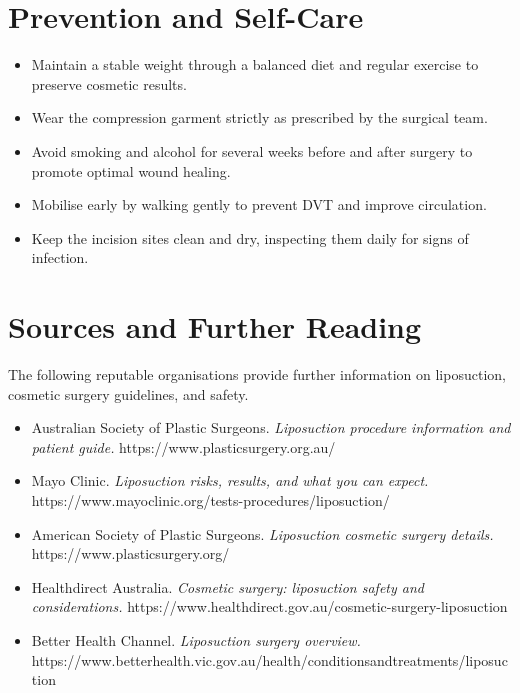 \section*{Prevention and Self-Care}
\begin{itemize}
    \item Maintain a stable weight through a balanced diet and regular exercise to preserve cosmetic results.
    \item Wear the compression garment strictly as prescribed by the surgical team.
    \item Avoid smoking and alcohol for several weeks before and after surgery to promote optimal wound healing.
    \item Mobilise early by walking gently to prevent DVT and improve circulation.
    \item Keep the incision sites clean and dry, inspecting them daily for signs of infection.
\end{itemize}

\section*{Sources and Further Reading}
The following reputable organisations provide further information on liposuction, cosmetic surgery guidelines, and safety.
\begin{itemize}
    \item Australian Society of Plastic Surgeons. \textit{Liposuction procedure information and patient guide.} https://www.plasticsurgery.org.au/
    \item Mayo Clinic. \textit{Liposuction risks, results, and what you can expect.} https://www.mayoclinic.org/tests-procedures/liposuction/
    \item American Society of Plastic Surgeons. \textit{Liposuction cosmetic surgery details.} https://www.plasticsurgery.org/
    \item Healthdirect Australia. \textit{Cosmetic surgery: liposuction safety and considerations.} https://www.healthdirect.gov.au/cosmetic-surgery-liposuction
    \item Better Health Channel. \textit{Liposuction surgery overview.} https://www.betterhealth.vic.gov.au/health/conditionsandtreatments/liposuction
\end{itemize}
